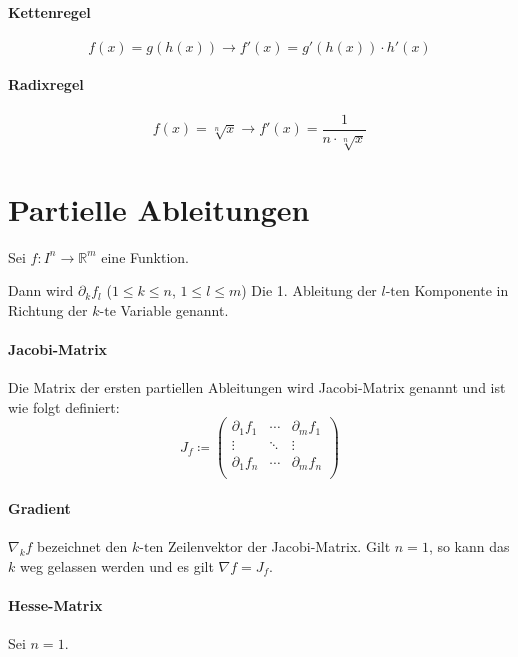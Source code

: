 		\paragraph{Kettenregel}
			\[ f(x) = g(h(x)) \rightarrow f'(x) = g'(h(x)) \cdot h'(x) \]

		\paragraph{Radixregel}
			\[ f(x) = \sqrt[n]{x} \rightarrow f'(x) = \frac{1}{n \cdot \sqrt[n]{x}} \]

\section{Partielle Ableitungen}
Sei $ f : I ^ n \rightarrow \mathbb{R} ^ m $ eine Funktion.

Dann wird $ \partial _ k f _ l $ ($ 1 \leq k \leq n $, $ 1 \leq l \leq m $) Die 1. Ableitung der $ l\text{-ten} $ Komponente in Richtung der $ k\text{-te} $ Variable genannt.

\paragraph{Jacobi-Matrix}
	Die Matrix der ersten partiellen Ableitungen wird Jacobi-Matrix genannt und ist wie folgt definiert:
	\begin{equation*}
		J _ f \coloneqq
		\begin{pmatrix}
			\partial _ 1 f _ 1 & \cdots & \partial _ m f _ 1 \\
			\vdots             & \ddots & \vdots             \\
			\partial _ 1 f _ n & \cdots & \partial _ m f _ n \\
		\end{pmatrix}
	\end{equation*}

\paragraph{Gradient}
	$ \nabla _ k f $ bezeichnet den $ k\text{-ten} $ Zeilenvektor der Jacobi-Matrix. Gilt $ n = 1 $, so kann das $ k $ weg gelassen werden und es gilt $ \nabla f = J _ f $.

\paragraph{Hesse-Matrix}
	Sei $ n = 1 $.

